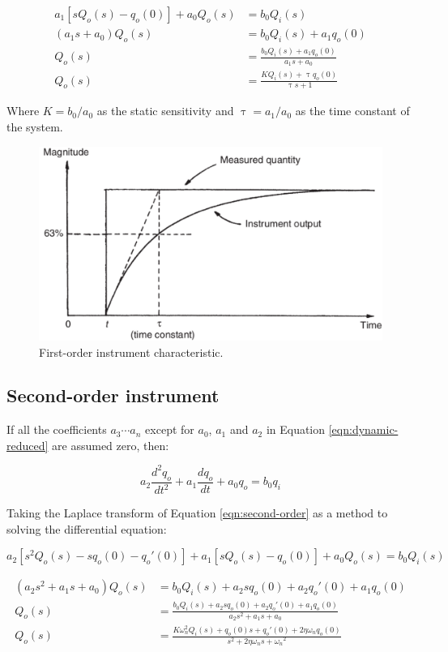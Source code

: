 \documentclass[a4paper,11pt,dvipsnames]{book}
\begin{document}
\begin{align}
a_1 \left[ s Q_o(s) - q_o(0) \right] + a_0 Q_o(s) &= b_0 Q_i(s) \\ 
( a_1 s + a_0 ) Q_o(s) &= b_0 Q_i(s) + a_1 q_o(0) \\
Q_o(s) &= \frac{ b_0 Q_i(s) + a_1 q_o(0) }{ a_1 s + a_0 } \\
Q_o(s) &= \frac{ K Q_i(s) + \uptau q_o(0) }{ \uptau s + 1} \label{eqn:first-order-laplace}
\end{align}

Where $K = b_0/a_0$ as the static sensitivity and $\uptau = a_1/a_0$ as the time constant of the system.

\begin{figure}[h!]\label{fig:first-order}
\centering
  \includegraphics[width=0.7\linewidth]{first-order}
  \caption{First-order instrument characteristic.} 
\end{figure}

\subsection*{Second-order instrument}

If all the coefficients $a_3 \cdots a_n$ except for $a_0$, $a_1$ and $a_2$ in Equation \ref{eqn:dynamic-reduced} are assumed zero, then: 

\begin{equation}\label{eqn:second-order}
a_2 \frac{d^2q_o}{dt^2} + a_1 \frac{dq_o}{dt} + a_0 q_o = b_0 q_i  
\end{equation}

Taking the Laplace transform of Equation \ref{eqn:second-order} as a method to solving the differential equation:

\begin{equation}
a_2 \left[ s^2 Q_o(s) - s q_o(0) - q_o'(0) \right] + a_1 \left[ sQ_o(s) - q_o(0) \right] + a_0Q_o(s) = b_0 Q_i(s) 
\end{equation}

\begin{align} 
(a_2 s^2 + a_1 s + a_0 ) Q_o(s) &= b_0 Q_i(s) + a_2sq_o(0) + a_2 q_o'(0) + a_1 q_o(0) \\
Q_o(s) &= \frac{ b_0 Q_i(s) + a_2sq_o(0) + a_2 q_o'(0) + a_1 q_o(0) }{ a_2 s^2 + a_1 s + a_0 } \\
Q_o(s) &= \frac{ K \omega_n^2 Q_i(s) + q_o(0)s + q_o'(0) + 2 \eta \omega_n q_o(0) }{ s^2 + 2 \eta \omega_n s + {\omega_n}^2} \label{eqn:second-order-laplace}
\end{align}
\end{document}
